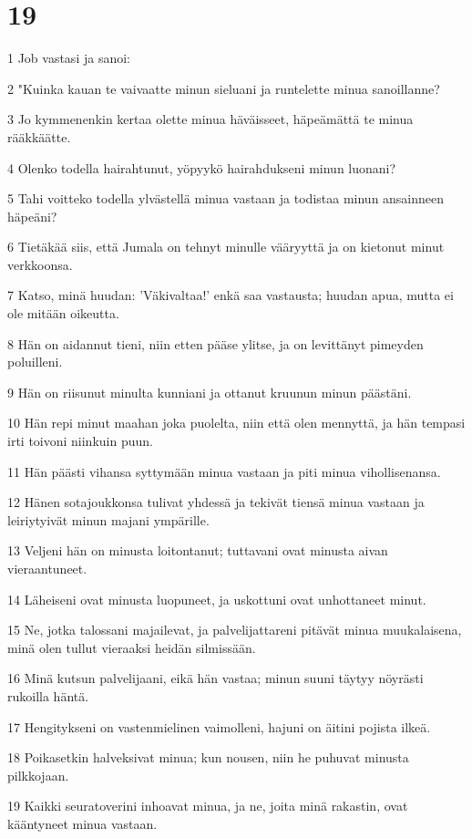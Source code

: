 \chapter{19}

\par 1 Job vastasi ja sanoi:
\par 2 "Kuinka kauan te vaivaatte minun sieluani ja runtelette minua sanoillanne?
\par 3 Jo kymmenenkin kertaa olette minua häväisseet, häpeämättä te minua rääkkäätte.
\par 4 Olenko todella hairahtunut, yöpyykö hairahdukseni minun luonani?
\par 5 Tahi voitteko todella ylvästellä minua vastaan ja todistaa minun ansainneen häpeäni?
\par 6 Tietäkää siis, että Jumala on tehnyt minulle vääryyttä ja on kietonut minut verkkoonsa.
\par 7 Katso, minä huudan: 'Väkivaltaa!' enkä saa vastausta; huudan apua, mutta ei ole mitään oikeutta.
\par 8 Hän on aidannut tieni, niin etten pääse ylitse, ja on levittänyt pimeyden poluilleni.
\par 9 Hän on riisunut minulta kunniani ja ottanut kruunun minun päästäni.
\par 10 Hän repi minut maahan joka puolelta, niin että olen mennyttä, ja hän tempasi irti toivoni niinkuin puun.
\par 11 Hän päästi vihansa syttymään minua vastaan ja piti minua vihollisenansa.
\par 12 Hänen sotajoukkonsa tulivat yhdessä ja tekivät tiensä minua vastaan ja leiriytyivät minun majani ympärille.
\par 13 Veljeni hän on minusta loitontanut; tuttavani ovat minusta aivan vieraantuneet.
\par 14 Läheiseni ovat minusta luopuneet, ja uskottuni ovat unhottaneet minut.
\par 15 Ne, jotka talossani majailevat, ja palvelijattareni pitävät minua muukalaisena, minä olen tullut vieraaksi heidän silmissään.
\par 16 Minä kutsun palvelijaani, eikä hän vastaa; minun suuni täytyy nöyrästi rukoilla häntä.
\par 17 Hengitykseni on vastenmielinen vaimolleni, hajuni on äitini pojista ilkeä.
\par 18 Poikasetkin halveksivat minua; kun nousen, niin he puhuvat minusta pilkkojaan.
\par 19 Kaikki seuratoverini inhoavat minua, ja ne, joita minä rakastin, ovat kääntyneet minua vastaan.
